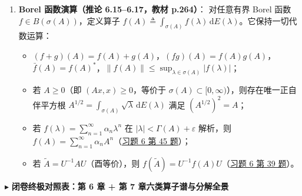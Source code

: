 \documentclass[11pt,a4paper]{article}
\providecommand{\tightlist}{\setlength{\itemsep}{2pt}\setlength{\parskip}{0pt}}
\newcommand{\SubSubHeading}[1]{%
  \Needspace{6.5\baselineskip}\vspace{5.5pt}\noindent
  \textcolor{AccentMain}{\scriptsize$\blacktriangleright$}\hspace{4pt}%
  {\small\bfseries\color{AccentMain}#1}\par\nopagebreak[4]\vspace{2.5pt}%
}
\begin{document}
\begin{enumerate}
\item
  \textbf{Borel 函数演算（推论 6.15--6.17，教材 p.264）}： 对任意有界 Borel 函数 \(f \in B(\sigma(A))\)，定义算子 \(f(A) \triangleq \int_{\sigma(A)} f(\lambda)\,\mathrm{d}E(\lambda)\)。它保持一切代数运算：

  \begin{itemize}
  \tightlist
  \item
    \((f+g)(A) = f(A)+g(A)\)，\((fg)(A) = f(A)g(A)\)，\(\bar{f}(A) = f(A)^*\)，\(\lVert f(A)\rVert \le \sup_{\lambda\in\sigma(A)}\lvert f(\lambda)\rvert\)；
  \item
    若 \(A \ge 0\)（即 \((Ax,x)\ge 0\)，等价于 \(\sigma(A)\subset[0,\infty)\)），则存在唯一正自伴平方根 \(A^{1/2} = \int_{\sigma(A)} \sqrt{\lambda}\,\mathrm{d}E(\lambda)\) 满足 \((A^{1/2})^2 = A\)；
  \item
    若 \(f(\lambda) = \sum_{n=1}^\infty \alpha_n \lambda^n\) 在 \(\lvert\lambda\rvert < \Gamma(A) + \varepsilon\) 解析，则 \(f(A) = \sum_{n=1}^\infty \alpha_n A^n\)（\hyperlink{prob:6-45}{\textcolor{LinkColor}{习题 6 第 45 题}}）；
  \item
    若 \(\tilde{A} = U^{-1}AU\)（酉等价），则 \(f(\tilde{A}) = U^{-1}f(A)U\)（\hyperlink{prob:6-39}{\textcolor{LinkColor}{习题 6 第 39 题}}）。
  \end{itemize}
\end{enumerate}

\SubSubHeading{闭卷终极对照表：第 6 章 + 第 7 章六类算子谱与分解全景}
\end{document}
